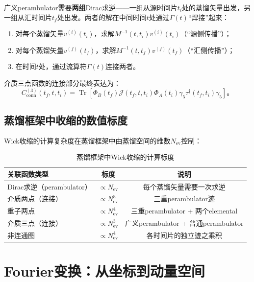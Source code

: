 \documentclass[12pt,a4paper]{ctexart}
\theoremstyle{definition}
\begin{document}
广义perambulator需要\textbf{两组}Dirac求逆——一组从源时间片$t_i$处的蒸馏矢量出发，另一组从汇时间片$t_f$处出发。两者的解在中间时间$t$处通过$\Gamma(t)$``焊接''起来：

\begin{enumerate}
    \item 对每个蒸馏矢量$v^{(i)}(t_i)$，求解$M^{-1}(t, t_i)v^{(i)}(t_i)$（``源侧传播''）；
    \item 对每个蒸馏矢量$v^{(f)}(t_f)$，求解$M^{-1}(t, t_f)v^{(f)}(t_f)$（``汇侧传播''）；
    \item 在时间$t$处，通过流算符$\Gamma(t)$连接两者。
\end{enumerate}

介质三点函数的连接部分最终表达为\cite{Peardon2009}：
\begin{equation}
C^{(3)}_{\text{conn}}(t_f, t, t_i) = \operatorname{Tr}\left[ \Phi_B(t_f) \mathcal{J}(t_f, t, t_i) \Phi_A(t_i) \gamma_5 \tau^\dagger(t_f, t_i) \gamma_5 \right]。
\label{eq:3pt_factorized}
\end{equation}

\subsection{蒸馏框架中收缩的数值标度}

Wick收缩的计算复杂度在蒸馏框架中由蒸馏空间的维数$N_{\text{ev}}$控制\cite{Egerer2021a}：

\begin{table}[H]
\centering
\caption{蒸馏框架中Wick收缩的计算标度\cite{Egerer2021a,Peardon2009}}
\label{tab:contraction_scaling}
\begin{tabular}{lcc}
\toprule
关联函数类型 & 标度 & 说明 \\
\midrule
Dirac求逆（perambulator） & $\propto N_{\text{ev}}$ & 每个蒸馏矢量需要一次求逆 \\
介质两点（连接） & $\propto N^3_{\text{ev}}$ & 三重perambulator迹 \\
重子两点 & $\propto N^4_{\text{ev}}$ & 三重perambulator + 两个elemental \\
介质三点（连接） & $\propto N^3_{\text{ev}}$ & 广义perambulator + 普通perambulator \\
非连通图 & $\propto N^4_{\text{ev}}$ & 各时间片的独立迹之乘积 \\
\bottomrule
\end{tabular}
\end{table}

\section{Fourier变换：从坐标到动量空间}
\end{document}
